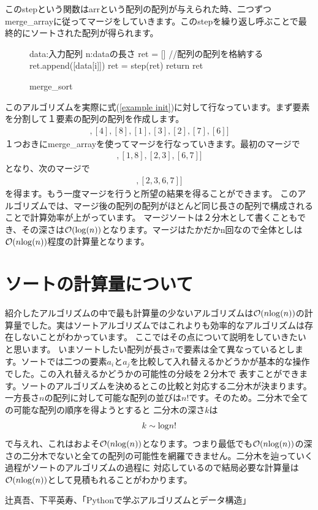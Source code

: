 \documentclass[dvipdfmx,pic,eepic,ecltree]{jarticle}
\begin{document}
このstepという関数はarrという配列の配列が与えられた時、二つずつmerge\_arrayに従ってマージをしていきます。このstepを繰り返し呼ぶことで最終的にソートされた配列が得られます。
\begin{figure}[H]
\begin{algorithm}[H]
	\caption{merge\_sort}
	\label{merge_sort}
	\begin{algorithmic}[1] 
	\STATE data:入力配列
	\STATE n:dataの長さ
	\STATE ret = [] //配列の配列を格納する
	\STATE ret.append([data[i]])
	\ENDFOR
	\STATE ret = step(ret)
	\ENDWHILE
	\STATE return ret
	\end{algorithmic}
\end{algorithm}
\end{figure}
このアルゴリズムを実際に式(\ref{example init})に対して行なっています。まず要素を分割して１要素の配列の配列を作成します。
\begin{eqnarray}
[[5],[4], [8], [1], [3], [2],[7], [6]]
\end{eqnarray}
１つおきにmerge\_arrayを使ってマージを行なっていきます。最初のマージで
\begin{eqnarray}
[[4, 5], [1, 8],[2, 3], [6, 7]]
\end{eqnarray}
となり、次のマージで
\begin{eqnarray}
[[1, 4, 5, 8],[2, 3, 6, 7]]
\end{eqnarray}
を得ます。もう一度マージを行うと所望の結果を得ることができます。
このアルゴリズムでは、マージ後の配列の配列がほとんど同じ長さの配列で構成されることで計算効率が上がっています。
マージソートは２分木として書くこともでき、その深さは$\mathcal{O}({\rm log}(n))$となります。マージはたかだかn回なので全体としは$\mathcal{O}(n{\rm log}(n))$程度の計算量となります。
\section{ソートの計算量について}
紹介したアルゴリズムの中で最も計算量の少ないアルゴリズムは$\mathcal{O}(n{\rm log}(n))$の計算量でした。実はソートアルゴリズムではこれよりも効率的なアルゴリズムは存在しないことがわかっています。
ここではその点について説明をしていきたいと思います。
いまソートしたい配列が長さ$n$で要素は全て異なっているとします。ソートでは二つの要素$a_{i}$と$a_{j}$を比較して入れ替えるかどうかが基本的な操作でした。この入れ替えるかどうかの可能性の分岐を２分木で
表すことができます。ソートのアルゴリズムを決めるとこの比較と対応する二分木が決まります。一方長さ$n$の配列に対して可能な配列の並びは$n!$です。そのため。二分木で全ての可能な配列の順序を得ようとすると
二分木の深さ$k$は
\begin{eqnarray}
k\sim {\rm log}n!
\end{eqnarray}
で与えれ、これはおよそ$\mathcal{O}(n{\rm log}(n))$となります。つまり最低でも$\mathcal{O}(n{\rm log}(n))$の深さの二分木でないと全ての配列の可能性を網羅できません。二分木を辿っていく過程がソートのアルゴリズムの過程に
対応しているので結局必要な計算量は$\mathcal{O}(n{\rm log}(n))$として見積もれることがわかります。
\begin{thebibliography}{9}
\item 辻真吾、下平英寿、「Pythonで学ぶアルゴリズムとデータ構造」
\end{thebibliography}
\end{document}
